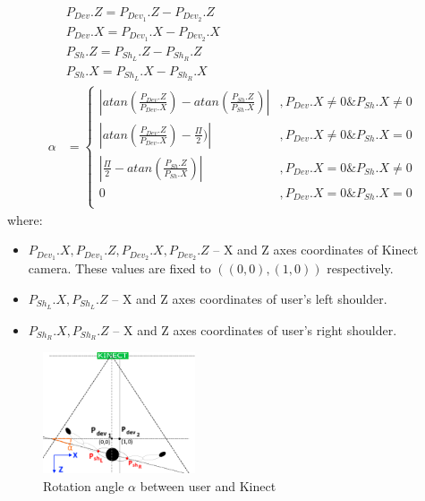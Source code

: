 \documentclass{llncs}
\begin{document}
		
\begin{equation}   
	\label{eq:characteristics:kinect:bodyRotationAngle}
	\begin{split}
		&P_{Dev}.Z = P_{{Dev}_1}.Z - P_{{Dev}_2}.Z \\
		&P_{Dev}.X = P_{{Dev}_1}.X - P_{{Dev}_2}.X \\
		&P_{Sh}.Z = P_{{Sh}_L}.Z - P_{{Sh}_R}.Z \\
		&P_{Sh}.X = P_{{Sh}_L}.X - P_{{Sh}_R}.X \\
		\alpha &= 
		\begin{cases} 
			|atan(\frac{P_{Dev}.Z}{P_{Dev}.X}) - atan(\frac{P_{Sh}.Z}{P_{Sh}.X})| & ,P_{Dev}.X \neq 0 \& P_{Sh}.X \neq 0 \\
			|atan(\frac{P_{Dev}.Z}{P_{Dev}.X}) - \frac{\Pi}{2})|                  & ,P_{Dev}.X \neq 0 \& P_{Sh}.X = 0    \\
			|\frac{\Pi}{2} - atan(\frac{P_{Sh}.Z}{P_{Sh}.X})|                     & ,P_{Dev}.X = 0 \& P_{Sh}.X \neq 0    \\
			0                                                                     & ,P_{Dev}.X = 0 \& P_{Sh}.X = 0       \\
		\end{cases}
	\end{split}
\end{equation}
where:
\begin{itemize}
	\item $P_{{Dev}_1}.X, P_{{Dev}_1}.Z, P_{{Dev}_2}.X, P_{{Dev}_2}.Z$ -- X and Z axes coordinates of Kinect camera. These values are fixed to $((0, 0),(1, 0))$ respectively.
	\item $P_{{Sh}_L}.X, P_{{Sh}_L}.Z$ -- X and Z axes coordinates of user's left shoulder.
	\item $P_{{Sh}_R}.X, P_{{Sh}_R}.Z$ -- X and Z axes coordinates of user's right shoulder.
\end{itemize}
		
		
\begin{figure}[h!]		
	\centering
	\includegraphics[width=0.4\textwidth]{images/kinectAngle}
	\caption{Rotation angle $\alpha$ between user and Kinect}
	\label{fig:characteristics:kinect:bodyRotationAngle}
\end{figure}	
\end{document}
